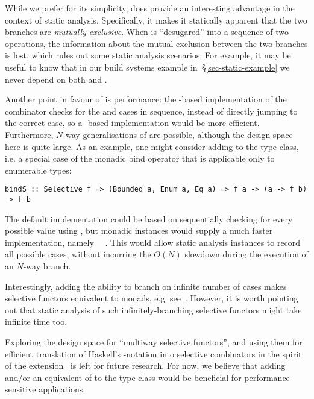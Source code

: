\noindent
While we prefer  for its simplicity,  does provide an
interesting advantage in the context of static analysis. Specifically, it makes
it statically apparent that the two branches are \emph{mutually exclusive}. When
 is ``desugared'' into a sequence of two  operations, the
information about the mutual exclusion between the two branches is lost, which
rules out some static analysis scenarios. For example, it may be useful to know
that in our build systems example in~\S\ref{sec-static-example} we never depend
on both  and .

Another point in favour of  is performance: the -based
implementation of the  combinator checks for the  and
 cases in sequence, instead of directly jumping to the correct case,
so a -based implementation would be more efficient. Furthermore,
$N$-way generalisations of  are possible, although the design space
here is quite large. As an example, one might consider adding  to the
 type class, i.e. a special case of the monadic bind operator that
is applicable only to enumerable types:

\vspace{1mm}
\begin{verbatim}
bindS :: Selective f => (Bounded a, Enum a, Eq a) => f a -> (a -> f b) -> f b
\end{verbatim}
\vspace{1mm}

\noindent
The default implementation could be based on sequentially checking for every
possible value using , but monadic instances would supply a much
faster implementation, namely ~\hs{=}~\hs{(>>=)}. This would allow
static analysis instances to record all possible cases, without incurring
the $O(N)$ slowdown during the execution of an $N$-way branch.

Interestingly, adding the ability to branch on infinite number of cases makes
selective functors equivalent to monads, e.g. see~\citet{peebles2013sigma}.
However, it is worth pointing out that static analysis of such
infinitely-branching selective functors might take infinite time too.

Exploring the design space for ``multiway selective functors'', and using them
for efficient translation of Haskell's -notation into selective
combinators in the spirit of the 
extension~\citep{marlow2016applicativedo} is left for future research. For now,
we believe that adding  and/or an equivalent of  to the
 type class would be beneficial for performance-sensitive
applications.

